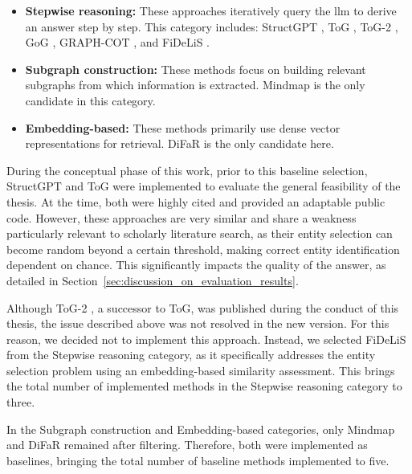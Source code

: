 \begin{itemize}
    \item \textbf{Stepwise reasoning:} These approaches iteratively query the \gls{llm} to derive an answer step by step. This category includes: StructGPT \cite{jiang_structgpt_2023}, ToG \cite{sun_think--graph_2024}, ToG-2 \cite{ma_think--graph_2024}, GoG \cite{xu_generate--graph_2024}, GRAPH-COT \cite{jin_graph_2024}, and FiDeLiS \cite{sui_fidelis_2024}.
    \item \textbf{Subgraph construction:} These methods focus on building relevant subgraphs from which information is extracted. Mindmap \cite{wen_mindmap_2024} is the only candidate in this category.
    \item \textbf{Embedding-based:} These methods primarily use dense vector representations for retrieval. DiFaR \cite{baek_direct_2023} is the only candidate here.
\end{itemize}

During the conceptual phase of this work, prior to this baseline selection, StructGPT \cite{jiang_structgpt_2023} and ToG \cite{sun_think--graph_2024} were implemented to evaluate the general feasibility of the thesis. At the time, both were highly cited and provided an adaptable public code. However, these approaches are very similar and share a weakness particularly relevant to scholarly literature search, as their entity selection can become random beyond a certain threshold, making correct entity identification dependent on chance. This significantly impacts the quality of the answer, as detailed in Section~\ref{sec:discussion_on_evaluation_results}.

Although ToG-2 \cite{ma_think--graph_2024}, a successor to ToG, was published during the conduct of this thesis, the issue described above was not resolved in the new version. For this reason, we decided not to implement this approach. Instead, we selected FiDeLiS \cite{sui_fidelis_2024} from the Stepwise reasoning category, as it specifically addresses the entity selection problem using an embedding-based similarity assessment. This brings the total number of implemented methods in the Stepwise reasoning category to three.

In the Subgraph construction and Embedding-based categories, only Mindmap \cite{wen_mindmap_2024} and DiFaR \cite{baek_direct_2023} remained after filtering. Therefore, both were implemented as baselines, bringing the total number of baseline methods implemented to five.




